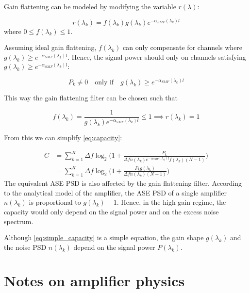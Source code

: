 \documentclass[a4paper]{article}
\begin{document}
Gain flattening can be modeled by modifying the variable $r(\lambda)$:

\begin{equation}
	r(\lambda_k) = f(\lambda_k)g(\lambda_k)e^{-\alpha_{SMF}(\lambda_k)l}
\end{equation}
where $0\leq f(\lambda_k) \leq 1$. 

Assuming ideal gain flattening, $f(\lambda_k)$ can only compensate for channels where $g(\lambda_k) \geq e^{-\alpha_{SMF}(\lambda_k)l}$. Hence, the signal power should only on channels satisfying $g(\lambda_k) \geq e^{-\alpha_{SMF}(\lambda_k)l}$:

\begin{equation}
	P_k \neq 0 \quad\text{only if}\quad g(\lambda_k) \geq e^{-\alpha_{SMF}(\lambda_k)l}
\end{equation}

This way the gain flattening filter can be chosen such that

\begin{equation}
	f(\lambda_k) = \frac{1}{g(\lambda_k)e^{-\alpha_{SMF}(\lambda_k)l}} \leq 1 \implies r(\lambda_k) = 1
\end{equation}

From this we can simplify \eqref{eq:capacity}:

\begin{align}
	C &= \sum_{k = 1}^{K} \Delta f\log_2\bigg(1 + \frac{P_k}{\Delta fn(\lambda_k)e^{-\alpha_{SMF}(\lambda_k)l}f(\lambda_k)(N-1)}\bigg) \\
	&=\sum_{k = 1}^{K} \Delta f\log_2\bigg(1 + \frac{P_kg(\lambda_k)}{\Delta fn(\lambda_k)(N-1)}\bigg) \label{eq:simple_capacity}
\end{align}
The equivalent ASE PSD is also affected by the gain flattening filter. According to the analytical model of the amplifier, the ASE PSD of a single amplifier $n(\lambda_k)$ is proportional to $g(\lambda_k)-1$. Hence, in the high gain regime, the capacity would only depend on the signal power and on the excess noise spectrum.

Although  \eqref{eq:simple_capacity} is a simple equation, the gain shape $g(\lambda_k)$ and the noise PSD $n(\lambda_k)$ depend on the signal power $P(\lambda_k)$.

\newpage
\section{Notes on amplifier physics}
\end{document}
